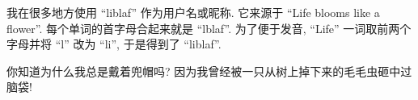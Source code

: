 

\vspace{4.0mm}

\begin{cvitems}
  \item 我在很多地方使用 ``liblaf'' 作为用户名或昵称.
        它来源于 ``Life blooms like a flower''.
        每个单词的首字母合起来就是 ``lblaf''.
        为了便于发音, ``Life'' 一词取前两个字母并将 ``l'' 改为 ``li'', 于是得到了 ``liblaf''.
  \item 你知道为什么我总是戴着兜帽吗?
        因为我曾经被一只从树上掉下来的毛毛虫砸中过脑袋!
\end{cvitems}
